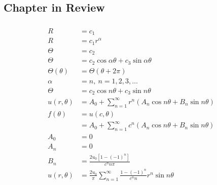 \documentclass{article}
\begin{document}
\subsection{Chapter in Review}

\subsubsection{}

\begin{align*}
  R              & = c_1                                                                              \\
  R              & = c_1 r^\alpha                                                                     \\
  \Theta         & = c_2                                                                              \\
  \Theta         & = c_2 \cos \alpha \theta + c_3 \sin \alpha \theta                                  \\
  \Theta(\theta) & = \Theta(\theta + 2 \pi)                                                           \\
  \alpha         & = n,\ n = 1, 2, 3, \ldots                                                          \\
  \Theta         & = c_2 \cos n \theta + c_3 \sin n \theta                                            \\
  u(r, \theta)   & = A_0 + \sum_{n = 1}^\infty r^n (A_n \cos n \theta + B_n \sin n \theta)            \\
  f(\theta)      & = u(c, \theta)                                                                     \\
                 & = A_0 + \sum_{n = 1}^\infty c^n (A_n \cos n \theta + B_n \sin n \theta)            \\
  A_0            & = 0                                                                                \\
  A_n            & = 0                                                                                \\
  B_n            & = \frac{2 u_0 [1 - (-1)^n]}{c^n n \pi}                                             \\
  u(r, \theta)   & = \frac{2 u_0}{\pi} \sum_{n = 1}^\infty \frac{1 - (-1)^n}{c^n n} r^n \sin n \theta
\end{align*}
\end{document}
